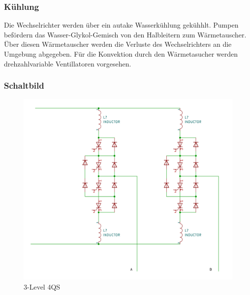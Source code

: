 \subsubsection*{Kühlung}
Die Wechselrichter werden über ein autake Wasserkühlung gekühhlt. Pumpen befördern das Wasser-Glykol-Gemisch von den Halbleitern 
zum Wärmetauscher. Über diesen Wärmetauscher werden die Verluste des Wechselrichters an die Umgebung abgegeben. Für die Konvektion durch den Wärmetasucher werden
drehzahlvariable Ventillatoren vorgesehen.  

\subsubsection*{Schaltbild}

\begin{figure}[!htb]
    \centering
    \begin{minipage}[b]{0.5\textwidth}
        \includegraphics[width=\textwidth,frame]{Bilder/umrichter_schaltbild.png}
      \caption{3-Level 4QS}
    \end{minipage}
    \hfill
    \begin{minipage}[b]{0.4\textwidth}

\end{minipage}
\end{figure}
